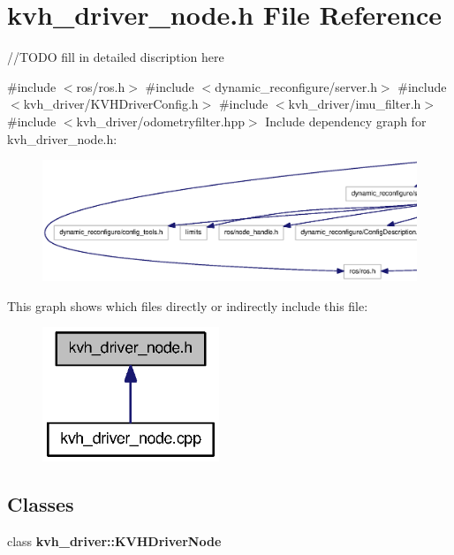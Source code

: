 \section{kvh\-\_\-driver\-\_\-node.\-h \-File \-Reference}
\label{kvh__driver__node_8h}


//\-T\-O\-D\-O fill in detailed discription here  


{\ttfamily \#include $<$ros/ros.\-h$>$}\*
{\ttfamily \#include $<$dynamic\-\_\-reconfigure/server.\-h$>$}\*
{\ttfamily \#include $<$kvh\-\_\-driver/\-K\-V\-H\-Driver\-Config.\-h$>$}\*
{\ttfamily \#include $<$kvh\-\_\-driver/imu\-\_\-filter.\-h$>$}\*
{\ttfamily \#include $<$kvh\-\_\-driver/odometryfilter.\-hpp$>$}\*
\-Include dependency graph for kvh\-\_\-driver\-\_\-node.\-h\-:
\nopagebreak
\begin{figure}[H]
\begin{center}
\leavevmode
\includegraphics[width=350pt]{kvh__driver__node_8h__incl}
\end{center}
\end{figure}
\-This graph shows which files directly or indirectly include this file\-:\nopagebreak
\begin{figure}[H]
\begin{center}
\leavevmode
\includegraphics[width=150pt]{kvh__driver__node_8h__dep__incl}
\end{center}
\end{figure}
\subsection*{\-Classes}
\begin{DoxyCompactItemize}
\item 
class {\bf kvh\-\_\-driver\-::\-K\-V\-H\-Driver\-Node}
\end{DoxyCompactItemize}
